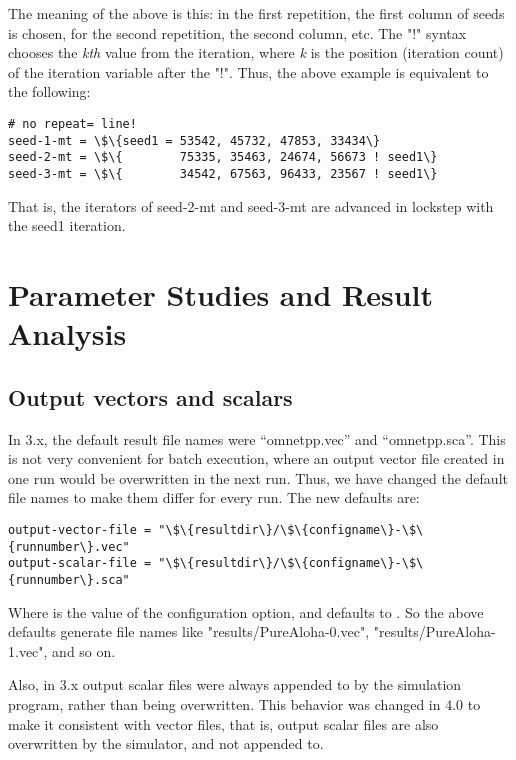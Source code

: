 The meaning of the above is this: in the first repetition, the first
column of seeds is chosen, for the second repetition, the second
column, etc. The "!" syntax chooses the
\textit{kth} value from the iteration, where \textit{k} is the position
(iteration count) of the iteration variable after the
"!". Thus, the above example is equivalent
to the following:

\begin{Verbatim}[commandchars=\\\{\}]
# no repeat= line!
seed-1-mt = \$\{seed1 = 53542, 45732, 47853, 33434\}
seed-2-mt = \$\{        75335, 35463, 24674, 56673 ! seed1\}
seed-3-mt = \$\{        34542, 67563, 96433, 23567 ! seed1\}
\end{Verbatim}

That is, the iterators of seed-2-mt and seed-3-mt are advanced
in lockstep with the seed1 iteration.


\section{Parameter Studies and Result Analysis}

\subsection{Output vectors and scalars}

In {\opp} 3.x, the default result file names were ``omnetpp.vec'' and
``omnetpp.sca''. This is not very convenient for batch execution, where
an output vector file created in one run would be overwritten in the
next run. Thus, we have changed the default file names to make them
differ for every run. The new defaults are:

\begin{Verbatim}[commandchars=\\\{\}]
output-vector-file = "\$\{resultdir\}/\$\{configname\}-\$\{runnumber\}.vec"
output-scalar-file = "\$\{resultdir\}/\$\{configname\}-\$\{runnumber\}.sca"
\end{Verbatim}

Where  is the value of the  configuration
option, and defaults to . So the above defaults generate
file names like "results/PureAloha-0.vec", "results/PureAloha-1.vec",
and so on.

Also, in {\opp} 3.x output scalar files were always appended to by the
simulation program, rather than being overwritten. This behavior was
changed in 4.0 to make it consistent with vector files, that is, output
scalar files are also overwritten by the simulator, and not appended
to.

